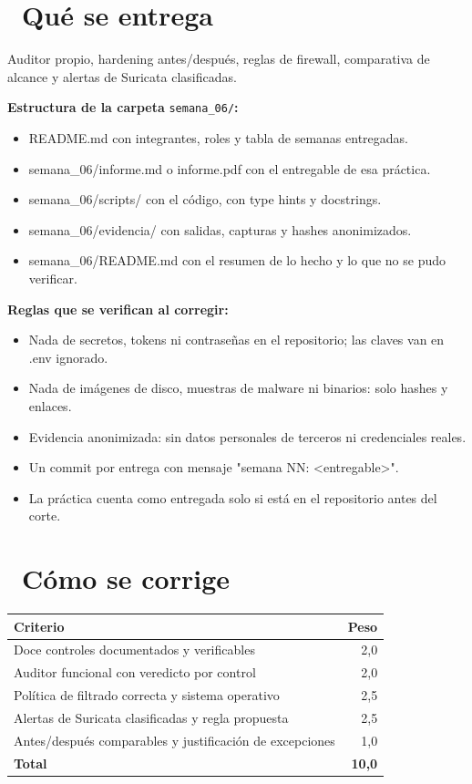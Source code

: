 \documentclass[11pt,a4paper]{article}
\newcommand{\iconotexto}[2]{\textcolor{cyanNeon}{\faIcon{#1}}~#2}
\begin{document}
\section{\iconotexto{box-open}{Qué se entrega}}

Auditor propio, hardening antes/después, reglas de firewall, comparativa de alcance y alertas de Suricata clasificadas.

\textbf{Estructura de la carpeta} \texttt{semana\_06/}\textbf{:}

\begin{itemize}[leftmargin=1.4em,itemsep=2pt,topsep=3pt]
  \item README.md con integrantes, roles y tabla de semanas entregadas.
  \item semana\_06/informe.md o informe.pdf con el entregable de esa práctica.
  \item semana\_06/scripts/ con el código, con type hints y docstrings.
  \item semana\_06/evidencia/ con salidas, capturas y hashes anonimizados.
  \item semana\_06/README.md con el resumen de lo hecho y lo que no se pudo verificar.
\end{itemize}

\textbf{Reglas que se verifican al corregir:}

\begin{itemize}[leftmargin=1.4em,itemsep=2pt,topsep=3pt]
  \item Nada de secretos, tokens ni contraseñas en el repositorio; las claves van en .env ignorado.
  \item Nada de imágenes de disco, muestras de malware ni binarios: solo hashes y enlaces.
  \item Evidencia anonimizada: sin datos personales de terceros ni credenciales reales.
  \item Un commit por entrega con mensaje "semana NN: \textless{}entregable\textgreater{}".
  \item La práctica cuenta como entregada solo si está en el repositorio antes del corte.
\end{itemize}

\section{\iconotexto{ruler-combined}{Cómo se corrige}}

\begin{tabularx}{\linewidth}{@{}X r@{}}
\toprule
Criterio & Peso\\
\midrule
Doce controles documentados y verificables & 2,0 \\
Auditor funcional con veredicto por control & 2,0 \\
Política de filtrado correcta y sistema operativo & 2,5 \\
Alertas de Suricata clasificadas y regla propuesta & 2,5 \\
Antes/después comparables y justificación de excepciones & 1,0 \\
\midrule
\textbf{Total} & \textbf{10,0}\\
\bottomrule
\end{tabularx}
\end{document}
